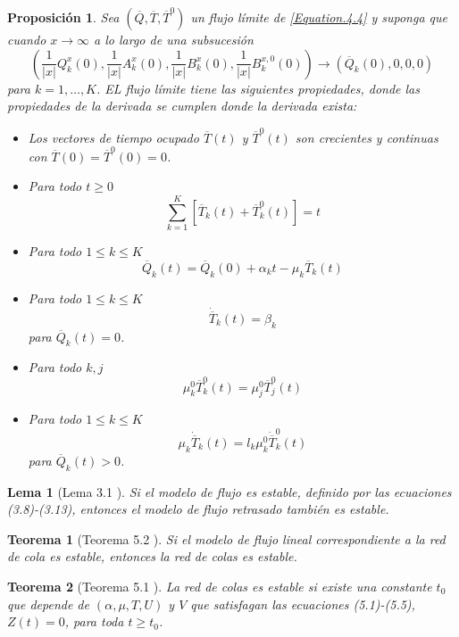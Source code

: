 \documentclass{article}
\newtheorem{Teo}{Teorema}[section]
\newtheorem{Prop}{Proposición}[section]
\newtheorem{Lema}{Lema}[section]
\numberwithin{equation}{section}
\begin{document}
\begin{Prop}
 Sea $\left(\overline{Q},\overline{T},\overline{T}^{0}\right)$ un flujo l\'imite de \ref{Equation.4.4} y suponga que cuando $x\rightarrow\infty$ a lo largo de
una subsucesi\'on \[\left(\frac{1}{|x|}Q_{k}^{x}\left(0\right),\frac{1}{|x|}A_{k}^{x}\left(0\right),\frac{1}{|x|}B_{k}^{x}\left(0\right),\frac{1}{|x|}B_{k}^{x,0}\left(0\right)\right)\rightarrow\left(\overline{Q}_{k}\left(0\right),0,0,0\right)\] para $k=1,\ldots,K$. EL flujo l\'imite tiene las siguientes propiedades, donde las propiedades de la derivada se cumplen donde la derivada exista:
\begin{itemize}
 \item[i)] Los vectores de tiempo ocupado $\overline{T}\left(t\right)$ y $\overline{T}^{0}\left(t\right)$ son crecientes y continuas con $\overline{T}\left(0\right)=\overline{T}^{0}\left(0\right)=0$.
\item[ii)] Para todo $t\geq0$ \[\sum_{k=1}^{K}\left[\overline{T}_{k}\left(t\right)+\overline{T}_{k}^{0}\left(t\right)\right]=t\]
\item[iii)] Para todo $1\leq k\leq K$ \[\overline{Q}_{k}\left(t\right)=\overline{Q}_{k}\left(0\right)+\alpha_{k}t-\mu_{k}\overline{T}_{k}\left(t\right)\]
\item[iv)]  Para todo $1\leq k\leq K$ \[\dot{{\overline{T}}}_{k}\left(t\right)=\beta_{k}\] para $\overline{Q}_{k}\left(t\right)=0$.
\item[v)] Para todo $k,j$ \[\mu_{k}^{0}\overline{T}_{k}^{0}\left(t\right)=\mu_{j}^{0}\overline{T}_{j}^{0}\left(t\right)\]
\item[vi)]  Para todo $1\leq k\leq K$ \[\mu_{k}\dot{{\overline{T}}}_{k}\left(t\right)=l_{k}\mu_{k}^{0}\dot{{\overline{T}}}_{k}^{0}\left(t\right)\] para $\overline{Q}_{k}\left(t\right)>0$.
\end{itemize}
\end{Prop}

\begin{Lema}[Lema 3.1 \cite{Chen}]\label{Lema3.1}
Si el modelo de flujo es estable, definido por las ecuaciones (3.8)-(3.13), entonces el modelo de flujo retrasado tambi\'en es estable.
\end{Lema}

\begin{Teo}[Teorema 5.2 \cite{Chen}]\label{Tma.5.2}
Si el modelo de flujo lineal correspondiente a la red de cola es estable, entonces la red de colas es estable.
\end{Teo}

\begin{Teo}[Teorema 5.1 \cite{Chen}]\label{Tma.5.1.Chen}
La red de colas es estable si existe una constante $t_{0}$ que depende de $\left(\alpha,\mu,T,U\right)$ y $V$ que satisfagan las ecuaciones (5.1)-(5.5), $Z\left(t\right)=0$, para toda $t\geq t_{0}$.
\end{Teo}
\end{document}
